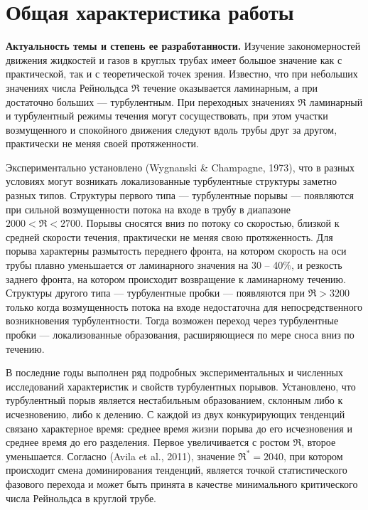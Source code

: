 \section*{\centering  Общая характеристика работы}

\textbf{Актуальность темы и степень ее разработанности.}
Изучение закономерностей движения жидкостей и газов в круглых трубах имеет большое значение как с практической, так и с теоретической точек зрения. Известно, что при небольших значениях числа Рейнольдса $\Re$ течение оказывается ламинарным, а при достаточно больших --- турбулентным. При переходных значениях $\Re$ ламинарный и турбулентный режимы течения могут сосуществовать, при этом участки возмущенного и спокойного движения следуют вдоль трубы друг за другом, практически не меняя своей протяженности. 

Экспериментально установлено (Wygnanski \& Champagne, 1973), что в разных условиях могут возникать локализованные турбулентные структуры заметно разных типов. Структуры первого типа --- турбулентные порывы --- появляются при сильной возмущенности потока на входе в трубу в диапазоне $2000<\Re<2700$. Порывы сносятся вниз по потоку со скоростью, близкой к средней скорости течения, практически не меняя свою протяженность. Для порыва характерны размытость переднего фронта, на котором скорость на оси трубы плавно уменьшается от ламинарного значения на 30 -- 40\%, и резкость заднего фронта, на котором происходит возвращение к ламинарному течению. Структуры другого типа --- турбулентные пробки --- появляются при $\Re>3200$ только когда возмущенность потока на входе недостаточна для непосредственного возникновения турбулентности. Тогда возможен переход через турбулентные пробки --- локализованные образования, расширяющиеся по мере сноса вниз по течению. 

В последние годы выполнен ряд подробных экспериментальных и численных исследований характеристик и свойств турбулентных порывов. Установлено, что турбулентный порыв является нестабильным образованием, склонным либо к исчезновению, либо к делению. С каждой из двух конкурирующих тенденций связано характерное время: среднее время жизни порыва до его исчезновения и среднее время до его разделения. Первое увеличивается с ростом $\Re$, второе уменьшается. Согласно (Avila et al., 2011), значение $\Re^*=2040$, при котором происходит смена доминирования тенденций, является точкой статистического фазового перехода и может быть принята в качестве минимального критического числа Рейнольдса в круглой трубе. 

